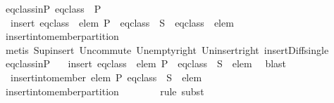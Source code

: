 \begin{isabellebody}
\ eq{\isacharunderscore}class{\isacharunderscore}in{\isacharunderscore}P{\isacharcolon}\ {\isachardoublequoteopen}eq{\isacharunderscore}class\ {\isasymin}\ P{\isachardoublequoteclose}\isanewline
\ \ \ \ \isamarkupfalse%
\ {\isachardoublequoteopen}{\isasymUnion}\ insert\ {\isacharparenleft}eq{\isacharunderscore}class\ {\isasymunion}\ {\isacharbraceleft}elem{\isacharbraceright}{\isacharparenright}\ {\isacharparenleft}P\ {\isacharminus}\ {\isacharbraceleft}eq{\isacharunderscore}class{\isacharbraceright}{\isacharparenright}\ {\isacharequal}\ {\isacharquery}S\ {\isasymunion}\ {\isacharparenleft}eq{\isacharunderscore}class\ {\isasymunion}\ {\isacharbraceleft}elem{\isacharbraceright}{\isacharparenright}{\isachardoublequoteclose}\isanewline
\ \ \ \ \ \ \isamarkupfalse%
\ insert{\isacharunderscore}into{\isacharunderscore}member{\isacharunderscore}partition{}\isanewline
\ \ \ \ \ \ \isamarkupfalse%
\ {\isacharparenleft}metis\ Sup{\isacharunderscore}insert\ Un{\isacharunderscore}commute\ Un{\isacharunderscore}empty{\isacharunderscore}right\ Un{\isacharunderscore}insert{\isacharunderscore}right\ insert{\isacharunderscore}Diff{\isacharunderscore}single{\isacharparenright}\isanewline
\ \ \ \ \isamarkupfalse%
\ eq{\isacharunderscore}class{\isacharunderscore}in{\isacharunderscore}P\ \isamarkupfalse%
\ {\isachardoublequoteopen}{\isasymUnion}\ insert\ {\isacharparenleft}eq{\isacharunderscore}class\ {\isasymunion}\ {\isacharbraceleft}elem{\isacharbraceright}{\isacharparenright}\ {\isacharparenleft}P\ {\isacharminus}\ {\isacharbraceleft}eq{\isacharunderscore}class{\isacharbraceright}{\isacharparenright}\ {\isacharequal}\ {\isacharquery}S\ {\isasymunion}\ {\isacharbraceleft}elem{\isacharbraceright}{\isachardoublequoteclose}\ \isamarkupfalse%
\ blast\isanewline
\ \ \ \ \isamarkupfalse%
\ \isamarkupfalse%
\ {\isachardoublequoteopen}{\isasymUnion}\ insert{\isacharunderscore}into{\isacharunderscore}member\ elem\ P\ eq{\isacharunderscore}class\ {\isacharequal}\ {\isacharquery}S\ {\isasymunion}\ {\isacharbraceleft}elem{\isacharbraceright}{\isachardoublequoteclose}\isanewline
\ \ \ \ \ \ \isamarkupfalse%
\ insert{\isacharunderscore}into{\isacharunderscore}member{\isacharunderscore}partition{}\isanewline
\ \ \ \ \ \ \isamarkupfalse%
\ {\isacharparenleft}rule\ subst{\isacharparenright}\isanewline
\ \ \isacommand{{\isacharbraceright}}\isamarkupfalse%
\isanewline
\ \ \isamarkupfalse%

\end{isabellebody}
